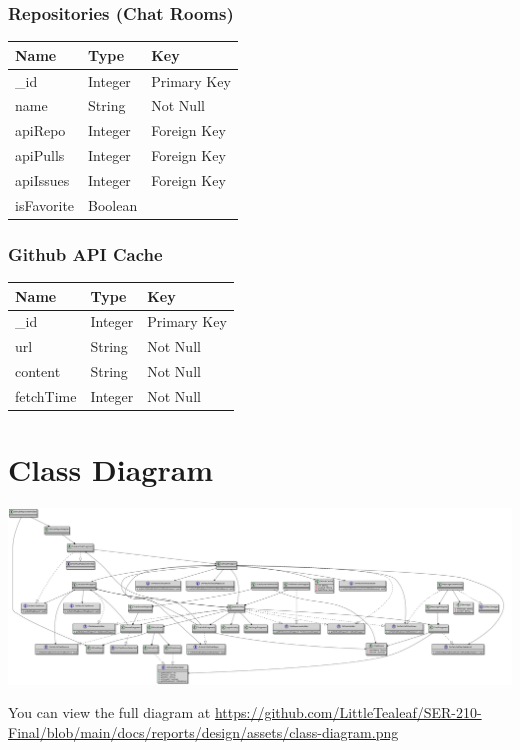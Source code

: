 \documentclass{report}
\begin{document}
\subsubsection{Repositories (Chat Rooms)}
\begin{tabular}{| l | l | l |}
    \hline
    \textbf{Name} & \textbf{Type} & \textbf{Key} \\
    \hline
    \hline
    \_id          & Integer       & Primary Key  \\
    \hline
    name          & String        & Not Null     \\
    \hline
    apiRepo       & Integer       & Foreign Key  \\
    \hline
    apiPulls      & Integer       & Foreign Key  \\
    \hline
    apiIssues     & Integer       & Foreign Key  \\
    \hline
    isFavorite    & Boolean       &              \\
    \hline
\end{tabular}

\subsubsection{Github API Cache}
\begin{tabular}{| l | l | l |}
    \hline
    \textbf{Name} & \textbf{Type} & \textbf{Key} \\
    \hline
    \hline
    \_id          & Integer       & Primary Key  \\
    \hline
    url           & String        & Not Null     \\
    \hline
    content       & String        & Not Null     \\
    \hline
    fetchTime     & Integer       & Not Null     \\
    \hline
\end{tabular}

\section{Class Diagram}

\begin{center}
    \includegraphics[scale=0.2]{class-diagram}
\end{center}
You can view the full diagram at \href{https://github.com/LittleTealeaf/SER-210-Final/blob/main/docs/reports/design/assets/class-diagram.png}{https://github.com/LittleTealeaf/SER-210-Final/blob/main/docs/reports/design/assets/class-diagram.png}\\
\end{document}
